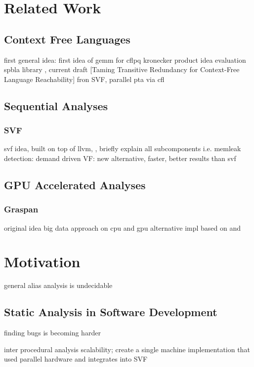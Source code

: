 \section{Related Work}
\subsection{Context Free Languages}
first general idea: \cite{reps1998program} first idea of gemm for cflpq \cite{azimov2018context} kronecker product idea \cite{orachev2020context} evaluation \cite{mishin2019evaluation} spbla library \cite{orachev2021spbla}, current draft [Taming Transitive Redundancy for Context-Free Language Reachability] fron SVF, parallel pta via cfl \cite{su2014parallel}
\subsection{Sequential Analyses}
\subsubsection{SVF}
svf idea, built on top of llvm, \cite{sui2016svf}, briefly explain all subcomponents i.e. memleak detection: \cite{sui2014detecting} demand driven VF: \cite{sui2018value} new alternative, faster, better results than svf \cite{shi2018pinpoint}
\subsection{GPU Accelerated Analyses}
\subsubsection{Graspan}
original idea \cite{zheng2008demand} big data approach on cpu \cite{wang2017graspan} and gpu \cite{zuo2021systemizing} alternative impl \cite{gu2020towards} based on \cite{mendez2012gpu} and \cite{mendez2010parallel}
\section{Motivation}
general alias analysis is undecidable
\subsection{Static Analysis in Software Development}
finding bugs is becoming harder

inter procedural analysis scalability; create a single machine implementation that used parallel hardware and integrates into SVF



